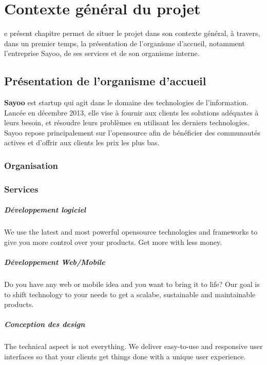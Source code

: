 \chapter{Contexte général du projet}
\begin{onehalfspace}

e présent chapitre permet de situer le projet dans son contexte général, à travers, dans un premier temps, la présentation de l'organisme d'accueil, notamment l'entreprise Sayoo, de ses services et de son organisme interne.

\newpage


\section{Présentation de l'organisme d'accueil}

\textbf{Sayoo} est startup qui agit dans le domaine des technologies de l'information. Lancée en décembre 2013, elle vise à fournir aux clients les solutions adéquates à leurs besoin, et résoudre leurs problèmes en utilisant les derniers technologies. Sayoo repose principalement sur l'opensource afin de bénéficier des communautés actives et d'offrir aux clients les prix les plus bas.


\subsection{Organisation}

\subsection{Services}

\paragraph*{Développement logiciel}
We use the latest and most powerful opensource technologies and frameworks to give you more control over your products. Get more with less money.

\paragraph*{Développement Web/Mobile}
Do you have any web or mobile idea and you want to bring it to life? Our goal is to shift technology to your needs to get a scalabe, sustainable and maintainable products.

\paragraph*{Conception des design}
The technical aspect is not everything. We deliver easy-to-use and responsive user interfaces so that your clients get things done with a unique user experience.


\end{onehalfspace}

